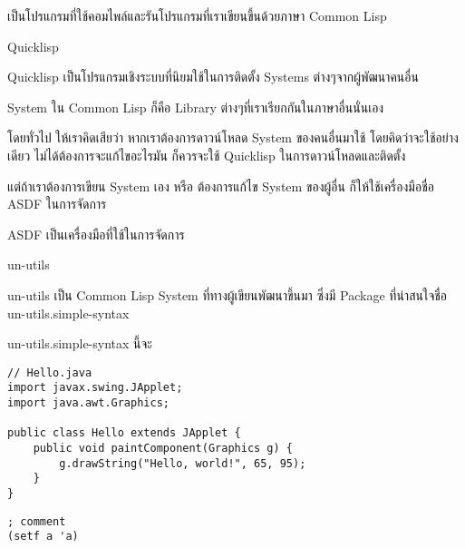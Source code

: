 \documentclass[a4paper]{article}
\begin{document}
เป็นโปรแกรมที่ใช้คอมไพล์และรันโปรแกรมที่เราเขียนขึ้นด้วยภาษา Common Lisp

Quicklisp

Quicklisp เป็นโปรแกรมเชิงระบบที่นิยมใช้ในการติดตั้ง Systems ต่างๆจากผู้พัฒนาคนอื่น

System ใน Common Lisp ก็คือ Library ต่างๆที่เราเรียกกันในภาษาอื่นนั่นเอง

โดยทั่วไป ให้เราคิดเสียว่า หากเราต้องการดาวน์โหลด System ของคนอื่นมาใช้
โดยคิดว่าจะใช้อย่างเดียว ไม่ได้ต้องการจะแก้ไขอะไรมัน ก็ควรจะใช้ Quicklisp
ในการดาวน์โหลดและติดตั้ง

แต่ถ้าเราต้องการเขียน System เอง หรือ ต้องการแก้ไข System ของผู้อื่น ก็ให้ใช้เครื่องมือชื่อ
ASDF ในการจัดการ

ASDF เป็นเครื่องมือที่ใช้ในการจัดการ

un-utils

un-utils เป็น Common Lisp System ที่ทางผู้เขียนพัฒนาขึ้นมา ซึ่งมี Package ที่น่าสนใจชื่อ
un-utils.simple-syntax

un-utils.simple-syntax นี้จะ

\lstset{language=Java}
\begin{lstlisting}
// Hello.java
import javax.swing.JApplet;
import java.awt.Graphics;

public class Hello extends JApplet {
    public void paintComponent(Graphics g) {
        g.drawString("Hello, world!", 65, 95);
    }    
}
\end{lstlisting}

\lstset{language=Lisp}
\begin{lstlisting}
; comment
(setf a 'a)
\end{lstlisting}
\end{document}
